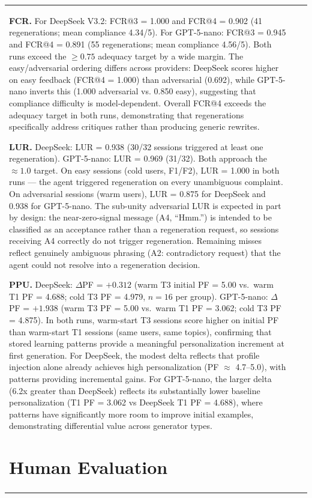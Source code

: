 \documentclass[conference]{IEEEtran}
\begin{document}
\begin{table}[htbp]
\begin{center}
\begin{tabular}{lll}
\textbf{FCR.} For DeepSeek V3.2: FCR@3 = 1.000 and FCR@4 = 0.902 (41 regenerations; mean compliance 4.34/5). For GPT-5-nano: FCR@3 = 0.945 and FCR@4 = 0.891 (55 regenerations; mean compliance 4.56/5). Both runs exceed the $\geq 0.75$ adequacy target by a wide margin. The easy/adversarial ordering differs across providers: DeepSeek scores higher on easy feedback (FCR@4 = 1.000) than adversarial (0.692), while GPT-5-nano inverts this (1.000 adversarial vs. 0.850 easy), suggesting that compliance difficulty is model-dependent. Overall FCR@4 exceeds the adequacy target in both runs, demonstrating that regenerations specifically address critiques rather than producing generic rewrites.

\textbf{LUR.} DeepSeek: LUR = 0.938 (30/32 sessions triggered at least one regeneration). GPT-5-nano: LUR = 0.969 (31/32). Both approach the $\approx 1.0$ target. On easy sessions (cold users, F1/F2), LUR = 1.000 in both runs --- the agent triggered regeneration on every unambiguous complaint. On adversarial sessions (warm users), LUR = 0.875 for DeepSeek and 0.938 for GPT-5-nano. The sub-unity adversarial LUR is expected in part by design: the near-zero-signal message (A4, ``Hmm.'') is intended to be classified as an acceptance rather than a regeneration request, so sessions receiving A4 correctly do not trigger regeneration. Remaining misses reflect genuinely ambiguous phrasing (A2: contradictory request) that the agent could not resolve into a regeneration decision.

\textbf{PPU.} DeepSeek: $\Delta$PF = $+0.312$ (warm T3 initial PF = 5.00 vs.\ warm T1 PF = 4.688; cold T3 PF = 4.979, $n = 16$ per group). GPT-5-nano: $\Delta$PF = $+1.938$ (warm T3 PF = 5.00 vs.\ warm T1 PF = 3.062; cold T3 PF = 4.875). In both runs, warm-start T3 sessions score higher on initial PF than warm-start T1 sessions (same users, same topics), confirming that stored learning patterns provide a meaningful personalization increment at first generation. For DeepSeek, the modest delta reflects that profile injection alone already achieves high personalization (PF $\approx$ 4.7--5.0), with patterns providing incremental gains. For GPT-5-nano, the larger delta (6.2x greater than DeepSeek) reflects its substantially lower baseline personalization (T1 PF = 3.062 vs DeepSeek T1 PF = 4.688), where patterns have significantly more room to improve initial examples, demonstrating differential value across generator types.


\section{Human Evaluation}
\label{sec:human_eval}


\end{tabular}
\end{center}
\end{table}
\end{document}
